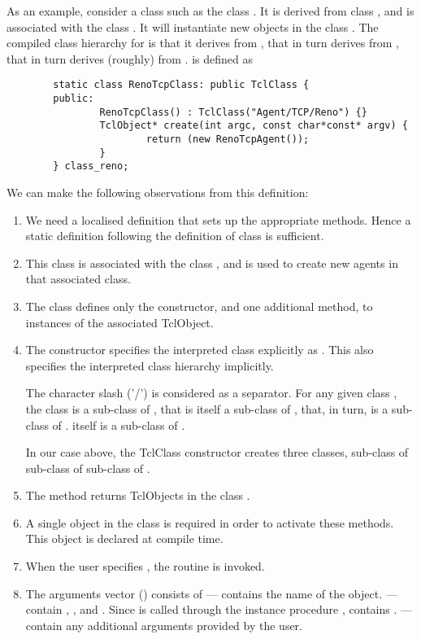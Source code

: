 \documentclass{article}
\begin{document}
As an example, consider a class such as the
class .
It is derived from class , and
is associated with the class .
It will instantiate new objects in the class .
The compiled class hierarchy for  is that
it derives from , that in turn derives from ,
that in turn derives (roughly) from .
 is defined as
\begin{verbatim}
        static class RenoTcpClass: public TclClass {
        public:
                RenoTcpClass() : TclClass("Agent/TCP/Reno") {}
                TclObject* create(int argc, const char*const* argv) {
                        return (new RenoTcpAgent());
                }
        } class_reno;
\end{verbatim}
We can make the following observations from this definition:
\begin{enumerate}
\item We need a localised definition that sets up the appropriate methods.
  Hence a static definition following the definition of class
   is sufficient.
\item This class is associated with the class , and 
  is used to create new agents in that associated class.
\item The class defines only the constructor, and one additional method,
  to  instances of the associated TclObject.
\item The constructor specifies the interpreted class explicitly as
  .  This also specifies the interpreted class
  hierarchy implicitly.

  The character slash ('/') is considered as a separator.
  For any given class , the class  is a
  sub-class of , that is itself a sub-class of ,
  that, in turn, is a sub-class of .   itself is a
  sub-class of .

  In our case above, the TclClass constructor creates three classes,
   sub-class of  sub-class of
   sub-class of .
\item The  method returns TclObjects in the
  class .
\item A single object in the class  is required in order
  to activate these methods.
  This object  is declared at compile time.
\item When the user specifies ,
  the routine  is invoked.
\item The arguments vector () consists of
  \subitem ---  contains the name of the object.
  \subitem ---  contain , ,
  and .  Since  is called through the
  instance procedure ,  contains
  .
  \subitem ---  contain any additional arguments
  provided by the user.
\end{enumerate}
\end{document}

